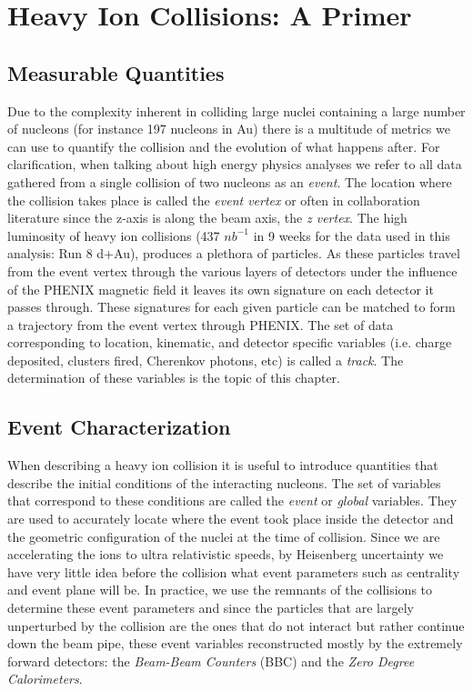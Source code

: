 \chapter{Heavy Ion Collisions: A Primer} %
\label{hicollisions}
\section{Measurable Quantities}
Due to the complexity inherent in colliding large nuclei containing a large number of nucleons (for instance 197 nucleons in Au) there is a multitude of metrics we can use to quantify the collision and the evolution of what happens after. For clarification, when talking about high energy physics analyses we refer to all data gathered from a single collision of two nucleons as an \textit{event}. The location where the collision takes place is called the \textit{event vertex} or often in collaboration literature since the z-axis is along the beam axis, the \textit{z vertex}. The high luminosity of heavy ion collisions (437 $nb^{-1}$ in 9 weeks for the data used in this analysis: Run 8 d+Au), produces a plethora of particles. As these particles travel from the event vertex through the various layers of detectors under the influence of the PHENIX magnetic field it leaves its own signature on each detector it passes through. These signatures for each given particle can be matched to form a trajectory from the event vertex through PHENIX. The set of data corresponding to location, kinematic, and detector specific variables (i.e. charge deposited, clusters fired, Cherenkov photons, etc) is called a \textit{track}. The determination of these variables is the topic of this chapter.

\section{Event Characterization}
When describing a heavy ion collision it is useful to introduce quantities that describe the initial conditions of the interacting nucleons. The set of variables that correspond to these conditions are called the \textit{event} or \textit{global} variables. They are used to accurately locate where the event took place inside the detector and the geometric configuration of the nuclei at the time of collision. Since we are accelerating the ions to ultra relativistic speeds, by Heisenberg uncertainty we have very little idea before the collision what event parameters such as centrality and event plane will be. In practice, we use the remnants of the collisions to determine these event parameters and since the particles that are largely unperturbed by the collision are the ones that do not interact but rather continue down the beam pipe, these event variables reconstructed mostly by the extremely forward detectors: the \textit{Beam-Beam Counters} (BBC) and the \textit{Zero Degree Calorimeters}. 

